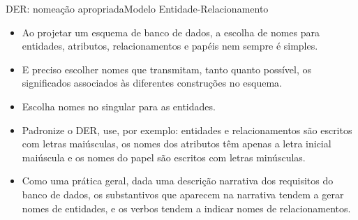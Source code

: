 \documentclass[t]{beamer}
\begin{document}

\begin{ftst}{DER: nomeação apropriada}{Modelo Entidade-Relacionamento}
\small
\begin{itemize}
    \item Ao projetar um esquema de banco de dados, a escolha de nomes para entidades, atributos, relacionamentos e papéis nem sempre é simples.
    \item E preciso escolher nomes que transmitam, tanto quanto possível, os significados associados às diferentes construções no esquema. 
    \item Escolha nomes no singular para as entidades.
    \item Padronize o DER, use, por exemplo: entidades e relacionamentos são escritos com letras maiúsculas, os nomes dos atributos têm apenas a letra inicial maiúscula e os nomes do papel são escritos com letras minúsculas.
    \item Como uma prática geral, dada uma descrição narrativa dos requisitos do banco de dados, os substantivos que aparecem na narrativa tendem a gerar nomes de entidades, e os verbos tendem a indicar nomes de relacionamentos. 
\end{itemize}
\end{ftst}
\end{document}
